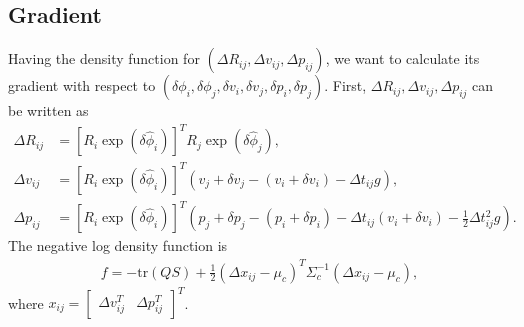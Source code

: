 \documentclass[10pt]{article}
\newcommand{\tr}[1]{\ensuremath{\mathrm{tr}\left( #1 \right)}}
\begin{document}
\subsection{Gradient}

Having the density function for $(\Delta R_{ij}, \Delta v_{ij}, \Delta p_{ij})$, we want to calculate its gradient with respect to $(\delta \phi_i, \delta \phi_j, \delta v_i, \delta v_j, \delta p_i, \delta p_j)$.
First, $\Delta R_{ij}, \Delta v_{ij}, \Delta p_{ij}$ can be written as
\begin{align}
	\Delta R_{ij} &= [R_i\exp(\delta \hat{\phi}_i)]^T R_j\exp(\delta \hat{\phi}_j), \\
	\Delta v_{ij} &= [R_i\exp(\delta \hat{\phi}_i)]^T (v_j+\delta v_j - (v_i+\delta v_i) - \Delta t_{ij}g), \\
	\Delta p_{ij} &= [R_i\exp(\delta \hat{\phi}_i)]^T (p_j+\delta p_j - (p_i+\delta p_i) - \Delta t_{ij}(v_i+\delta v_i) - \tfrac{1}{2}\Delta t_{ij}^2g).
\end{align}
The negative log density function is
\begin{align}
	f = -\tr{QS} + \tfrac{1}{2}(\Delta x_{ij} - \mu_c)^T \Sigma_c^{-1} (\Delta x_{ij} - \mu_c),
\end{align}
where $x_{ij} = \begin{bmatrix} \Delta v_{ij}^T & \Delta p_{ij}^T \end{bmatrix}^T$.
\end{document}
